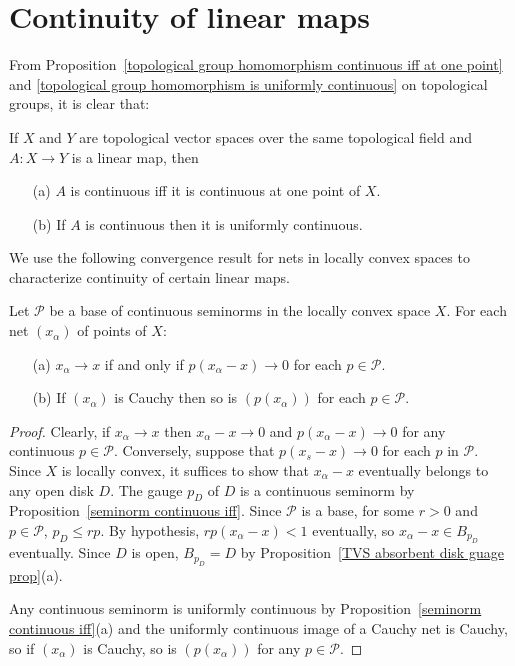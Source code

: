 \section{Continuity of linear maps}
From Proposition~\ref{topological group homomorphism continuous iff at one point} and \ref{topological group homomorphism is uniformly continuous} on topological groups, it is clear that:
\begin{proposition}
If $X$ and $Y$ are topological vector spaces over the same topological field and $A:X\to Y$ is a linear map, then
\begin{itemize}
\item[(a)] $A$ is continuous iff it is continuous at one point of $X$.
\item[(b)] If $A$ is continuous then it is uniformly continuous.
\end{itemize}
\end{proposition}
We use the following convergence result for nets in locally convex spaces to characterize continuity of certain linear maps.
\begin{proposition}\label{LCS Cauchy net under seminorm}
Let $\mathscr{P}$ be a base of continuous seminorms in the locally convex space $X$. For each net $(x_\alpha)$ of points of $X$:
\begin{itemize}
\item[(a)] $x_\alpha\to x$ if and only if $p(x_\alpha-x)\to 0$ for each $p\in\mathscr{P}$.
\item[(b)] If $(x_\alpha)$ is Cauchy then so is $(p(x_\alpha))$ for each $p\in\mathscr{P}$.
\end{itemize}
\end{proposition}
\begin{proof}
Clearly, if $x_\alpha\to x$ then $x_\alpha-x\to 0$ and $p(x_\alpha-x)\to 0$ for any continuous $p\in\mathscr{P}$. Conversely, suppose that $p(x_s-x)\to 0$ for each $p$ in $\mathscr{P}$. Since $X$ is locally convex, it suffices to show that $x_\alpha-x$ eventually belongs to any open disk $D$. The gauge $p_D$ of $D$ is a continuous seminorm by Proposition~\ref{seminorm continuous iff}. Since $\mathscr{P}$ is a base, for some $r>0$ and $p\in\mathscr{P}$, $p_D\leq rp$. By hypothesis, $rp(x_\alpha-x)<1$ eventually, so $x_\alpha-x\in B_{p_D}$ eventually. Since $D$ is open, $B_{p_D}=D$ by Proposition~\ref{TVS absorbent disk guage prop}(a).\par
Any continuous seminorm is uniformly continuous by Proposition~\ref{seminorm continuous iff}(a) and the uniformly continuous image of a Cauchy net is Cauchy, so if $(x_\alpha)$ is Cauchy, so is $(p(x_\alpha))$ for any $p\in\mathscr{P}$.
\end{proof}
